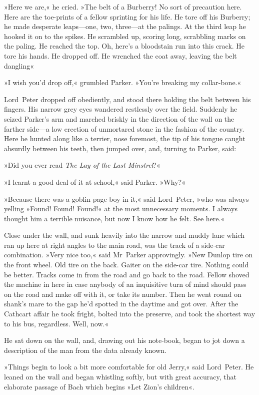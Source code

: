 »Here we are,« he cried. »The belt of a Burberry! No sort of precaution here. Here are the toe-prints of a fellow sprinting for his life. He tore off his Burberry; he made desperate leaps—one, two, three—at the palings. At the third leap he hooked it on to the spikes. He scrambled up, scoring long, scrabbling marks on the paling. He reached the top. Oh, here's a bloodstain run into this crack. He tore his hands. He dropped off. He wrenched the coat away, leaving the belt dangling\longdash«

»I wish you'd drop off,« grumbled Parker. »You're breaking my collar-bone.«

Lord~Peter dropped off obediently, and stood there holding the belt between his fingers. His narrow grey eyes wandered restlessly over the field. Suddenly he seized Parker's arm and marched briskly in the direction of the wall on the farther side—a low erection of unmortared stone in the fashion of the country. Here he hunted along like a terrier, nose foremost, the tip of his tongue caught absurdly between his teeth, then jumped over, and, turning to Parker, said:

»Did you ever read \textit{The Lay of the Last Minstrel}?«

»I learnt a good deal of it at school,« said Parker. »Why?«

»Because there was a goblin page-boy in it,« said Lord~Peter, »who was always yelling »Found! Found! Found!« at the most unnecessary moments.  I always thought him a terrible nuisance, but now I know how he felt.  See here.«

Close under the wall, and sunk heavily into the narrow and muddy lane which ran up here at right angles to the main road, was the track of a side-car combination.
»Very nice too,« said Mr~Parker approvingly. »New Dunlop tire on the front wheel. Old tire on the back. Gaiter on the side-car tire.  Nothing could be better. Tracks come in from the road and go back to the road. Fellow shoved the machine in here in case anybody of an inquisitive turn of mind should pass on the road and make off with it, or take its number. Then he went round on shank's mare to the gap he'd spotted in the daytime and got over. After the Cathcart affair he took fright, bolted into the preserve, and took the shortest way to his bus, regardless. Well, now.«

He sat down on the wall, and, drawing out his note-book, began to jot down a description of the man from the data already known.

»Things begin to look a bit more comfortable for old Jerry,« said Lord~Peter. He leaned on the wall and began whistling softly, but with great accuracy, that elaborate passage of Bach which begins »Let Zion's children«.

